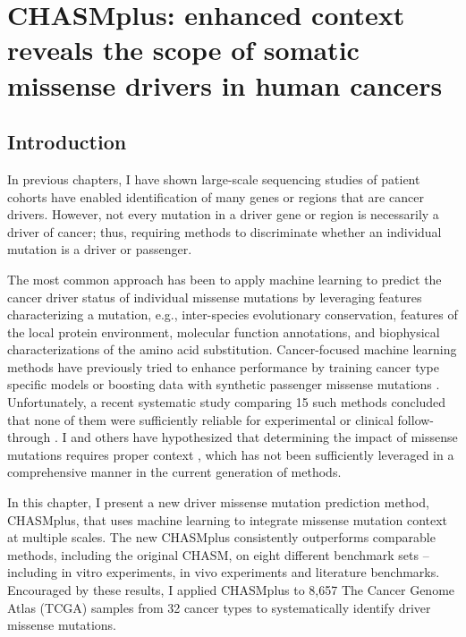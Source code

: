 
\chapter{CHASMplus: enhanced context reveals the scope of somatic missense drivers in human cancers}
\label{chap:ch6}

\section{Introduction}
In previous chapters, I have shown large-scale sequencing studies of patient cohorts have enabled identification of many genes or regions that are cancer drivers. However, not every mutation in a driver gene or region is necessarily a driver of cancer; thus, requiring methods to discriminate whether an individual mutation is a driver or passenger.

The most common approach has been to apply machine learning to predict the cancer driver status of individual missense mutations by leveraging features characterizing a mutation, e.g., inter-species evolutionary conservation, features of the local protein environment, molecular function annotations, and biophysical characterizations of the amino acid substitution. Cancer-focused machine learning methods have previously tried to enhance performance by training cancer type specific models \cite{RN36, RN29} or boosting data with synthetic passenger missense mutations \cite{RN29}.  Unfortunately, a recent systematic study comparing 15 such methods concluded that none of them were sufficiently reliable for experimental or clinical follow-through \cite{RN134, RN136}. I and others have hypothesized that determining the impact of missense mutations requires proper context \cite{RN47}, which has not been sufficiently leveraged in a comprehensive manner in the current generation of methods.

In this chapter, I present a new driver missense mutation prediction method, CHASMplus, that uses machine learning to integrate missense mutation context at multiple scales. The new CHASMplus consistently outperforms comparable methods, including the original CHASM, on eight different benchmark sets -- including in vitro experiments, in vivo experiments and literature benchmarks. Encouraged by these results, I applied CHASMplus to 8,657 The Cancer Genome Atlas (TCGA) samples from 32 cancer types to systematically identify driver missense mutations.

